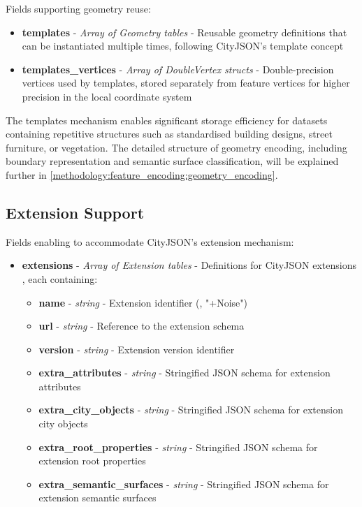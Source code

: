 Fields supporting geometry reuse:

\begin{itemize}
  \item \textbf{templates} - \textit{Array of Geometry tables} - Reusable geometry definitions that can be instantiated multiple times, following CityJSON's template concept \citep{cityjson_spec}

  \item \textbf{templates\_vertices} - \textit{Array of DoubleVertex structs} - Double-precision vertices used by templates, stored separately from feature vertices for higher precision in the local coordinate system \citep{cityjson_spec}
\end{itemize}

The templates mechanism enables significant storage efficiency for datasets containing repetitive structures such as standardised building designs, street furniture, or vegetation. The detailed structure of geometry encoding, including boundary representation and semantic surface classification, will be explained further in \autoref{methodology:feature_encoding:geometry_encoding}.

\subsection{Extension Support}
\label{methodology:header:extensions}

Fields enabling to accommodate CityJSON's extension mechanism:

\begin{itemize}
  \item \textbf{extensions} - \textit{Array of Extension tables} - Definitions for CityJSON extensions \citep{cityjson_spec}, each containing:
    \begin{itemize}
      \item \textbf{name} - \textit{string} - Extension identifier (\eg, "+Noise")
      \item \textbf{url} - \textit{string} - Reference to the extension schema
      \item \textbf{version} - \textit{string} - Extension version identifier
      \item \textbf{extra\_attributes} - \textit{string} - Stringified JSON schema for extension attributes
      \item \textbf{extra\_city\_objects} - \textit{string} - Stringified JSON schema for extension city objects
      \item \textbf{extra\_root\_properties} - \textit{string} - Stringified JSON schema for extension root properties
      \item \textbf{extra\_semantic\_surfaces} - \textit{string} - Stringified JSON schema for extension semantic surfaces
    \end{itemize}
\end{itemize}

